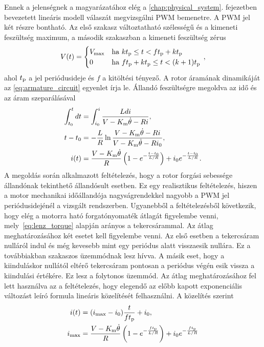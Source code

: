 Ennek a jelenségnek a magyarázatához elég a \ref{chap:physical_system}. fejezetben bevezetett lineáris modell válaszát 
megvizsgálni PWM bemenetre. A PWM jel két részre bontható. Az első szakasz változtatható szélességű és a 
kimeneti feszültség maximum, a második szakaszban a kimeneti feszültség zérus 
\begin{equation}
    V(t) = 
    \begin{cases}
        V_{\mathrm{max}} & \text{ha } kt_{\mathrm{p}} \le t < ft_{\mathrm{p}} + kt_{\mathrm{p}} \\
        0 & \text{ha } ft_{\mathrm{p}} + kt_{\mathrm{p}} \le t < (k+1)t_{\mathrm{p}}
    \end{cases}\,,
\end{equation}
ahol \(t_{\mathrm{p}}\) a jel periódusideje és \(f\) a kitöltési tényező.
A rotor áramának dinamikáját az \eqref{eq:armature_circuit} egyenlet írja le. 
Állandó feszültségre megoldva az idő és az áram szeparálásával
\begin{equation}
    \begin{split}
    \int_{t_0}^{t} dt &= \int_{i_0}^{i} \frac{L di}{V-K_{\mathrm{m}}\dot\theta - Ri}, \\
    t - t_0 &= -\frac{L}{R} \ln \frac{V-K_{\mathrm{m}}\dot\theta-Ri}{V-K_{\mathrm{m}}\dot\theta-Ri_0}, \\
    i(t) &= \frac{V-K_{\mathrm{m}}\dot\theta}{R}\left(1-e^{-\frac{t-t_0}{L/R}} \right) + i_0 e^{-\frac{t-t_0}{L/R}}. 
    \end{split}
\end{equation}
A megoldás során alkalmazott feltételezés, hogy a rotor forgási sebessége állandónak tekinthető állandósult esetben. 
Ez egy realisztikus feltételezés, hiszen a motor mechanikai időállandója nagyságrendekkel nagyobb a PWM jel periódusidejénél 
a vizsgált rendszerben. Ugyanebből a feltételezésből következik, hogy elég a motorra ható forgatónyomaték átlagát figyelembe venni, 
mely~\eqref{eq:lenz_torque} alapján arányos a tekercsárammal. Az átlag meghatározásához két esetet kell figyelembe venni. 
Az első esetben a tekercsáram nulláról indul és még kevesebb mint egy periódus alatt visszaesik nullára. Ez a továbbiakban szakaszos üzemmódnak 
lesz hívva. A másik eset, hogy a kiinduláskor nullától eltérő tekercsáram pontosan a periódus végén esik vissza a kiindulási értékére. 
Ez lesz a folytonos üzemmód. Az átlag meghatározásához fel lett használva az a feltételezés, hogy elegendő az előbb kapott 
exponenciális változást leíró formula lineáris közelítését felhasználni. A közelítés szerint 
\begin{equation}
    \begin{split}
        i(t) &= (i_{\mathrm{max}} - i_0)\frac{t}{ft_{\mathrm{p}}} + i_0, \\
        i_{\mathrm{max}} &= \frac{V-K_{\mathrm{m}}\dot\theta}{R}\left(1-e^{-\frac{ft_{\mathrm{p}}}{L/R}} \right) + i_0 e^{-\frac{ft_{\mathrm{p}}}{L/R}}
    \end{split}
\end{equation}
